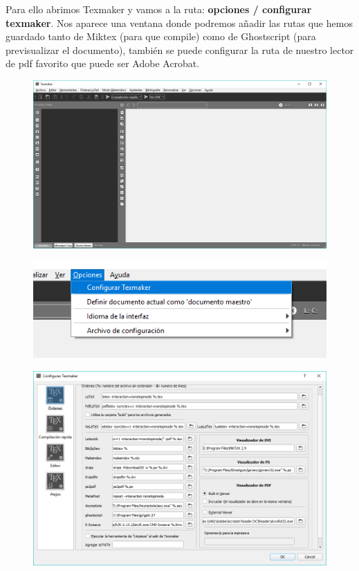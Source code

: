 \documentclass{article}
\begin{document}
Para ello abrimos Texmaker y vamos a la ruta: \textbf{opciones / configurar texmaker}.
Nos aparece una ventana donde podremos añadir las rutas que hemos guardado
tanto de Miktex (para que compile) como de Ghostscript (para previsualizar el
documento), también se puede configurar la ruta de nuestro lector de pdf favorito que
puede ser Adobe Acrobat.

\begin{figure}[h!]
  \centering
  \includegraphics[scale=0.5]{./imagenes/Configuracion_texmaker.png}
\end{figure}

\begin{figure}[h!]
  \centering
  \includegraphics[scale=0.75]{./imagenes/Configuracion_texmaker2.png}
\end{figure}
\clearpage

\begin{figure}[h!]
  \centering
  \includegraphics[scale=0.75]{./imagenes/Configuracion_texmaker3.png}
\end{figure}
\end{document}
